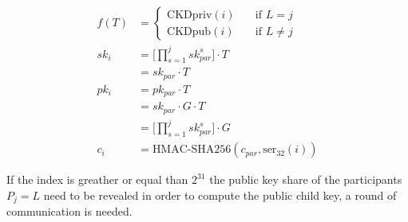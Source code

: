 \begin{equation*}
\begin{split}
  f(T) &=
  \begin{cases}
    \text{CKDpriv}(i) & \quad \text{if } L = j\\%
    \text{CKDpub}(i) & \quad \text{if } L \neq j
  \end{cases} \\
  sk_i &= \Bigg[ \prod_{s=1}^{j} sk_{par}^{s} \Bigg] \cdot T \\
       &= sk_{par} \cdot T \\
  pk_i &= pk_{par} \cdot T \\
       &= sk_{par} \cdot G \cdot T \\
       &= \Bigg[ \prod_{s=1}^{j} sk_{par}^{s} \Bigg] \cdot G \\
  c_i &= \text{HMAC-SHA256}(c_{par}, \text{ser}_{32}(i))
\end{split}
\end{equation*}

If the index is greather or equal than $2^{31}$
the public key share of the participants $P_j = L$ need to be
revealed in order to compute the public child key, a round of communication is
needed.


%


